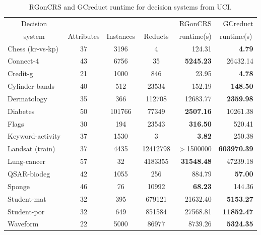 \documentclass[number,preprint,review,12pt]{elsarticle}
\begin{document}
	\begin{table}[!htb]
		\caption{RGonCRS and GCreduct runtime for decision systems from UCI.}\label{tab:matlab}
		\centering \footnotesize
		\begin{tabular}{|l|c|c|c|r|r|}
			\hline
			\multicolumn{1}{|c|}{Decision}&&&& RGonCRS & GCreduct\\ 
			\multicolumn{1}{|c|}{system} & Attributes & Instances & Reducts & runtime(s) & \multicolumn{1}{c|}{runtime(s)}\\ 
			\hline
			Chess (kr-vs-kp)          & 37         & 3196      & 4        & 124.31            & \textbf{4.79}      \\
			Connect-4                 & 43         & 6756      & 35       & \textbf{5245.23}  & 26432.14           \\
			Credit-g                  & 21         & 1000      & 846      & 23.95             & \textbf{4.78}      \\
			Cylinder-bands            & 40         & 512       & 23534    & 152.19            & \textbf{148.50}    \\
			Dermatology               & 35         & 366       & 112708   & 12683.77          & \textbf{2359.98}   \\
			Diabetes                  & 50         & 101766    & 77349    & \textbf{2507.16}  & 10261.38           \\
			Flags                     & 30         & 194       & 23543    & \textbf{316.50}   & 520.41             \\
			Keyword-activity          & 37         & 1530      & 3        & \textbf{3.82}     & 250.38             \\
			Landsat (train)           & 37         & 4435      & 12412798 & $>$1500000        & \textbf{603970.39} \\
			Lung-cancer               & 57         & 32        & 4183355  & \textbf{31548.48} & 47239.18           \\
			QSAR-biodeg               & 42         & 1055      & 256      &  884.79           & \textbf{57.00}     \\
			Sponge                    & 46         & 76        & 10992    & \textbf{68.23}    & 144.36             \\
			Student-mat               & 32         & 395       & 679121   & 21632.40          & \textbf{5153.27}   \\
			Student-por               & 32         & 649       & 851584   & 27568.81          & \textbf{11852.47}  \\
			Waveform                  & 22         & 5000      & 86977    & 8739.26           & \textbf{5324.35}   \\				
			\hline
    	\end{tabular}
    \end{table}
    	
\end{document}
